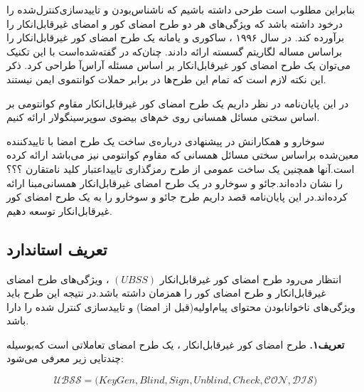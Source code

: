 \documentclass[12pt,a4paper]{article}
\begin{document}
بنابراین مطلوب است طرحی داشته باشیم که ناشناس‌بودن و تاییدسازی‌کنترل‌شده را درخود داشته باشد که ویژگی‌های هر دو طرح امضای کور و امضای غیرقابل‌انکار را برآورده کند.
در سال ۱۹۹۶ ، ساکوری و یامانه 
\cite{1st_blind_undeniable_sig}
یک طرح امضای کور غیرقابل‌انکار را براساس مساله لگاریتم گسسته ارائه دادند. چنان‌که در 
\cite{undeniable_chaum}
گفته‌شده‌است با این تکنیک می‌توان یک طرح امضای کور غیرقابل‌انکار بر اساس مسئله آراس‌آ 
طراحی کرد. ذکر این نکته لازم است که تمام این طرح‌ها در برابر حملات کوانتموی ایمن نیستند.

در این پایان‌نامه در نظر داریم یک طرح امضای کور غیرقابل‌انکار مقاوم کوانتومی بر اساس سختی مسائل همسانی روی خم‌های بیضوی سوپرسینگولار ارائه کنیم.


سوخارو و همکارانش در 
\cite{soukharev}
پیشنهادی درباره‌ی ساخت یک طرح امضا با تاییدکننده معین‌شده براساس سختی مسائل همسانی که مقاوم کوانتومی نیز می‌باشد ارائه کرده است.آنها همچنین یک ساخت عمومی از طرح رمزگذاری تایید‌اعتبار کلید نامتقارن ؟؟؟ را نشان داده‌اند.جائو و سوخارو در
\cite{undeniable}
یک طرح امضای غیرقابل‌انکار همسانی‌مبنا ارائه کرده‌اند.در این پایان‌نامه قصد داریم طرح جائو‌ و سوخارو را به یک طرح امضای کور غیرقابل‌انکار توسعه دهیم.

\subsection{تعریف استاندارد}\label{blind_def}

انتظار می‌رود طرح امضای کور غیرقابل‌انکار
$(UBSS)$
، ویژگی‌های طرح امضای غیرقابل‌انکار و طرح امضای کور را همزمان داشته باشد.در نتیجه این طرح باید ویژگی‌های ناخوانابودن محتوای پیام‌اولیه(قبل از امضا)
 و تاییدسازی کنترل شده 
 را دارا باشد.

\textbf{تعریف۱.}\label{definition_ubss}
طرح امضای کور غیرقابل‌انکار ، یک طرح امضای تعاملاتی است که‌بوسیله چندتایی زیر معرفی می‌شود:

$$ \mathcal{UBSS} = \big( KeyGen , Blind , Sign , Unblind , Check , \mathcal{CON} , \mathcal{DIS} \big) $$
\end{document}
